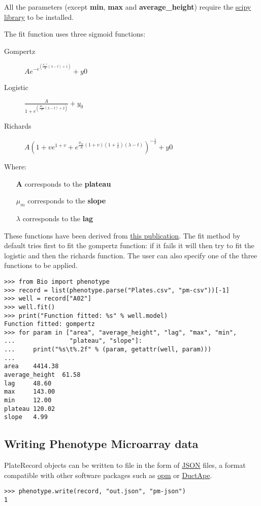 All the parameters (except \textbf{min}, \textbf{max} and \textbf{average\_height}) require the
\href{https://www.scipy.org/}{scipy library} to be installed.

The fit function uses three sigmoid functions:

\begin{description}
  \item[Gompertz] $Ae^{-e^{(\frac{\mu_{m}e}{A}(\lambda - t) + 1)}} + y0$

  \item[Logistic] $\frac{A}{1+e^{(\frac{4\mu_{m}}{A}(\lambda - t) + 2)}} + y_{0}$

  \item[Richards] $A(1 + ve^{1 + v} + e^{\frac{\mu_{m}}{A}(1 + v)(1 + \frac{1}{v})(\lambda - t)})^{-\frac{1}{v}} + y0$

\end{description}

Where:
\begin{itemize}
  \item[\textbf{A}] corresponds to the \textbf{plateau}

  \item[\textbf{$\mu_{m}$}] corresponds to the \textbf{slope}

  \item[\textbf{$\lambda$}] corresponds to the \textbf{lag}

\end{itemize}

These functions have been derived from \href{https://www.ncbi.nlm.nih.gov/pubmed/16348228}{this publication}.
The fit method by default tries first to fit the gompertz function: if it fails it will then try to fit
the logistic and then the richards function. The user can also specify one of the three functions to be applied.

\begin{verbatim}
>>> from Bio import phenotype
>>> record = list(phenotype.parse("Plates.csv", "pm-csv"))[-1]
>>> well = record["A02"]
>>> well.fit()
>>> print("Function fitted: %s" % well.model)
Function fitted: gompertz
>>> for param in ["area", "average_height", "lag", "max", "min",
...               "plateau", "slope"]:
...     print("%s\t%.2f" % (param, getattr(well, param)))
...
area    4414.38
average_height  61.58
lag     48.60
max     143.00
min     12.00
plateau 120.02
slope   4.99
\end{verbatim}

\subsection{Writing Phenotype Microarray data}
PlateRecord objects can be written to file in the form of
\href{https://en.wikipedia.org/wiki/JSON}{JSON}
files, a format compatible with other software packages such as
\href{https://www.dsmz.de/research/microorganisms/projects/analysis-of-omnilog-phenotype-microarray-data.html}{opm}
or \href{https://combogenomics.github.io/DuctApe/}{DuctApe}.
\begin{verbatim}
>>> phenotype.write(record, "out.json", "pm-json")
1
\end{verbatim}
